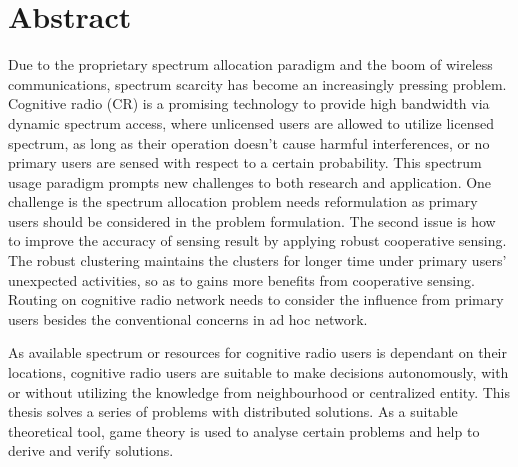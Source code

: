 \chapter{Abstract}
Due to the proprietary spectrum allocation paradigm and the boom of wireless communications, spectrum scarcity has become an increasingly pressing problem. 
Cognitive radio (CR) is a promising technology to provide high bandwidth via dynamic spectrum access, where unlicensed users  are allowed to utilize licensed spectrum, as long as their operation doesn't cause harmful interferences, or no primary users are sensed with respect to a certain probability.
This spectrum usage paradigm prompts new challenges to both research and application.
One challenge is the spectrum allocation problem needs reformulation as primary users should be considered in the problem formulation.
The second issue is how to improve the accuracy of sensing result by applying robust cooperative sensing.
The robust clustering maintains the clusters for longer time under primary users' unexpected activities, so as to gains more benefits from cooperative sensing.
Routing on cognitive radio network needs to consider the influence from primary users besides the conventional concerns in ad hoc network.

As available spectrum or resources for cognitive radio users is dependant on their locations, cognitive radio users are suitable to make decisions autonomously, with or without utilizing the knowledge from neighbourhood or centralized entity.
This thesis solves a series of problems with distributed solutions.
As a suitable theoretical tool, game theory is used to analyse certain problems and help to derive and verify solutions.


